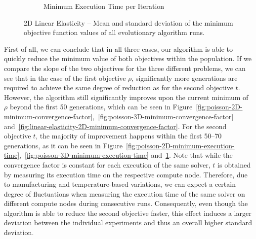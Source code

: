 \begin{figure}
\begin{subfigure}[b]{0.49\textwidth}
		\caption{Minimum Execution Time per Iteration}
		\label{fig:linear-elasticity-2D-minimum-execution-time}
	\end{subfigure}
	\caption[2D Linear Elasticity -- Mean and standard deviation of the minimum objective function values]{2D Linear Elasticity -- Mean and standard deviation of the minimum objective function values of all evolutionary algorithm runs.}
	\label{fig:linear-elasticity-2D-minimum-objectives}
\end{figure}
First of all, we can conclude that in all three cases, our algorithm is able to quickly reduce the minimum value of both objectives within the population.
If we compare the slope of the two objectives for the three different problems, we can see that in the case of the first objective $\rho$, significantly more generations are required to achieve the same degree of reduction as for the second objective $t$.
However, the algorithm still significantly improves upon the current minimum of $\rho$ beyond the first 50 generations, which can be seen in Figure~\ref{fig:poisson-2D-minimum-convergence-factor},~\ref{fig:poisson-3D-minimum-convergence-factor} and~\ref{fig:linear-elasticity-2D-minimum-convergence-factor}.
For the second objective $t$, the majority of improvement happens within the first 50--70 generations, as it can be seen in Figure~\ref{fig:poisson-2D-minimum-execution-time},~\ref{fig:poisson-3D-minimum-execution-time} and~\ref{fig:linear-elasticity-2D-minimum-execution-time}.
Note that while the convergence factor is constant for each execution of the same solver, $t$ is obtained by measuring its execution time on the respective compute node.
Therefore, due to manufacturing and temperature-based variations, we can expect a certain degree of fluctuations when measuring the execution time of the same solver on different compute nodes during consecutive runs.
Consequently, even though the algorithm is able to reduce the second objective faster, this effect induces a larger deviation between the individual experiments and thus an overall higher standard deviation.

